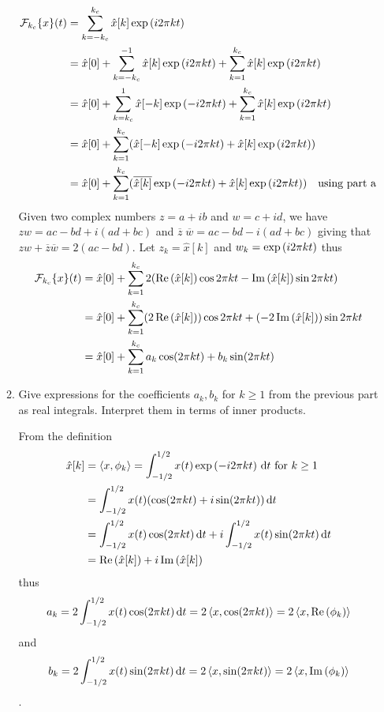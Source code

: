 \documentclass[12pt,twoside]{article}
\begin{document}
\begin{enumerate}
\begin{enumerate}
    \begin{align*}
		\mathcal{ F }_{k_c}\{x\}(t) 	&=	\sum_{k=-k_c}^{k_c} \hat{x}[k] \exp \left( i 2 \pi k t \right) \\
						&= 	\hat{x}[0] +  \sum_{k=-k_c}^{-1} \hat{x}[k] \exp \left( i 2 \pi k t \right) + \sum_{k=1}^{k_c} \hat{x}[k] \exp \left( i 2 \pi k t \right) \\
						&= 	\hat{x}[0] +  \sum_{k=k_c}^{1} \hat{x}[-k] \exp \left( - i 2 \pi k t \right) + \sum_{k=1}^{k_c} \hat{x}[k] \exp \left( i 2 \pi k t \right) \\
						&=	\hat{x}[0] +   \sum_{k=1}^{k_c} (\hat{x}[-k] \exp \left( - i 2 \pi k t \right) +  \hat{x}[k] \exp \left( i 2 \pi k t \right) ) \\
						&=	\hat{x}[0] +   \sum_{k=1}^{k_c} (\overline{ \hat{x}[k] } \exp \left( - i 2 \pi k t \right) +  \hat{x}[k] \exp \left( i 2 \pi k t \right) ) \text{ ~ using part a } \\
   \end{align*}
Given two complex numbers $z = a + i b$ and $w = c + id$, we have $zw = ac - bd + i (ad + bc)$ and $\overline{z} \; \overline{w} = ac - bd - i (ad + bc)$ giving that $z w + \overline{z} \overline{w} = 2 (ac - bd)$.
Let  $z_k = \hat{x}[k]$ and $w_k =     \exp \left( i 2 \pi k t \right) $ thus
   \begin{align*}
   	\mathcal{ F }_{k_c}\{x\}(t) 		&=  \hat{x}[0] +  \sum_{k=1}^{k_c} 2 (\operatorname{Re}\left(   \hat{x}[k]  \right) \cos{ 2 \pi k t} - \operatorname{Im}\left(  \hat{x}[k]   \right)  \sin{ 2 \pi k t} ) \\
						&= \hat{x}[0] +  \sum_{k=1}^{k_c} (2 \operatorname{Re}\left(   \hat{x}[k]  \right)) \cos{ 2 \pi k t} + (-2  \operatorname{Im}\left(  \hat{x}[k]   \right) ) \sin{ 2 \pi k t}  \\
						&= \hat{x}[0] +   \sum_{k=1}^{k_c} a_k \cos(2\pi k t) + b_k \sin(2\pi k t) \\
   \end{align*}
   
  \item Give
    expressions for the coefficients $a_k,b_k$ for $k\geq 1$ from the
    previous part as real integrals. Interpret them in terms of inner products.
    
    From the definition 
   \begin{align*}
  				 \hat{x}[k] 	&= \left \langle x, \phi_k\right \rangle = \int_{-1/2}^{1/2} x(t) \exp \left( - i2 \pi k t \right)  \, \text{d}t   \text{ for } k\geq 1\\
				 		&=  	\int_{-1/2}^{1/2} x(t) (\cos(2\pi k t) + i \sin(2\pi k t)) \, \text{d}t \\
						&=	 \int_{-1/2}^{1/2} x(t)  \cos(2\pi k t) \, \text{d}t + i \int_{-1/2}^{1/2} x(t) \sin(2\pi k t) \, \text{d}t \\
						&=	\operatorname{Re}\left(   \hat{x}[k]  \right) + i   \operatorname{Im}\left(  \hat{x}[k]   \right) \\			
   \end{align*}
   thus 
   $$a_k =2 \int_{-1/2}^{1/2} x(t)  \cos(2\pi k t) \, \text{d}t = 2  \left \langle x,  \cos(2\pi k t) \right \rangle =  2  \left \langle x, \operatorname{Re}\left(   \phi_k  \right)\right \rangle $$ 
   and $$b_k =  2 \int_{-1/2}^{1/2} x(t)   \sin(2\pi k t) \, \text{d}t = 2  \left \langle x,  \sin(2\pi k t) \right \rangle =  2  \left \langle x, \operatorname{Im}\left(   \phi_k  \right)\right \rangle$$.
          

\end{enumerate}
\end{enumerate}
\end{document}
